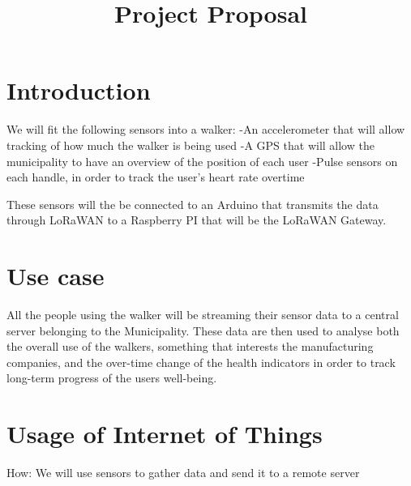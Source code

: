 \documentclass[conference]{IEEEtran}
\begin{document}
\title{Project Proposal}

\author{
\and
{}
\and
{}
}

\maketitle

\section{Introduction}
We will fit the following sensors into a walker:
 -An accelerometer that will allow tracking of how much the walker is being used
 -A GPS that will allow the municipality to have an overview of the position of each user
 -Pulse sensors on each handle, in order to track the user's heart rate overtime	

These sensors will the be connected to an Arduino that transmits the data through LoRaWAN to a Raspberry PI that will be the LoRaWAN Gateway. 	

\section{Use case}
	All the people using the walker will be streaming their sensor data to a central server belonging to the Municipality. These data are then used to analyse both the overall use of the walkers, something that interests the manufacturing companies, and the over-time change of the health indicators in order to track long-term progress of the users well-being.

\section{Usage of Internet of Things}
	How: We will use sensors to gather data and send it to a remote server
	
\end{document}

